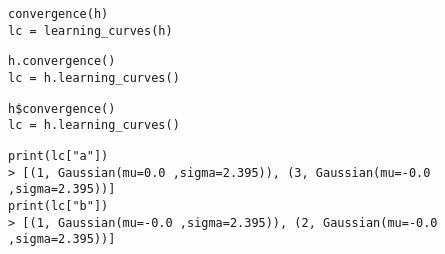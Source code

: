 \documentclass[article]{jss}
\newif\ifen
\newif\ifes
\newcommand{\en}[1]{\ifen#1\fi}
\newcommand{\es}[1]{\ifes#1\fi}
\begin{document}
%
\en{The TrueSkill Through Time model corrects all these problems.}
\es{El modelo TrueSkill Through Time corrige todos estos problemas.}
%
\en{To compute it we need to converge history using the class \texttt{convergence()}.}
\es{Para computarlo necesitamos converger la historia usando la clase \texttt{convergence()}.}
\begin{lstlisting}[backgroundcolor=\color{white},label=lst:ttt, caption=\relax, belowskip=-1.0 \baselineskip, aboveskip=-0 \baselineskip]
\end{lstlisting}
\begin{paracol}{3}
\begin{lstlisting}[backgroundcolor=\color{julia}, belowskip=-0.77 \baselineskip]
convergence(h)
lc = learning_curves(h)
\end{lstlisting}
  \switchcolumn
\begin{lstlisting}[backgroundcolor=\color{python}, belowskip=-0.77 \baselineskip]
h.convergence()
lc = h.learning_curves()
\end{lstlisting}
   \switchcolumn
\begin{lstlisting}[backgroundcolor=\color{r}, belowskip=-0.77 \baselineskip]
h$convergence()
lc = h.learning_curves()
\end{lstlisting}
\end{paracol}
\begin{lstlisting}[backgroundcolor=\color{all}]
print(lc["a"])
> [(1, Gaussian(mu=0.0 ,sigma=2.395)), (3, Gaussian(mu=-0.0 ,sigma=2.395))]
print(lc["b"])
> [(1, Gaussian(mu=-0.0 ,sigma=2.395)), (2, Gaussian(mu=-0.0 ,sigma=2.395))]
\end{lstlisting}
%
\en{It can be seen that the TrueSkill Through Time estimates are not only the same between players, but also have less uncertainty.}
\es{Se puede ver que las estimaciones de TrueSkill Through Time no sólo son las mismas entre jugadores, sino que tienen también menos incertidumbre.}
%
\en{In turn, the players' estimates do not change over time according to the assumption that skills do not change over time, \texttt{gamma = 0.0}.}
\es{A su vez las estimaciones de los jugadores no cambian en el tiempo de acuerdo al supuesto de que las habilidades no cambian en el tiempo, \texttt{gamma = 0.0}.}
%
\en{Something similar happens if we say that all items occurred at the same time.}
\es{Algo similar pasa si decimos que todas las partidas ocurrieron al mismo tiempo.}
%
\begin{lstlisting}[backgroundcolor=\color{white},label=lst:one_batch, caption=\relax, belowskip=-1.0 \baselineskip, aboveskip=-0 \baselineskip]
\end{lstlisting}
\end{document}
